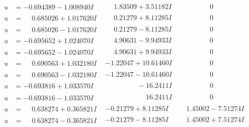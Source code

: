 \documentclass[1p]{elsarticle_modified}
\theoremstyle{definition}
\begin{document}
$$\begin{array}{c|c|c}
\begin{aligned}
u &= -0.694389 - 1.008940 I\end{aligned}
 & \phantom{-}1.83509 + 3.51182 I & \phantom{-0.000000 } 0 \\ \hline\begin{aligned}
u &= \phantom{-}0.685026 + 1.017620 I\end{aligned}
 & \phantom{-}0.21279 + 8.11285 I & \phantom{-0.000000 } 0 \\ \hline\begin{aligned}
u &= \phantom{-}0.685026 - 1.017620 I\end{aligned}
 & \phantom{-}0.21279 - 8.11285 I & \phantom{-0.000000 } 0 \\ \hline\begin{aligned}
u &= -0.695652 + 1.024070 I\end{aligned}
 & \phantom{-}4.90631 - 9.94933 I & \phantom{-0.000000 } 0 \\ \hline\begin{aligned}
u &= -0.695652 - 1.024070 I\end{aligned}
 & \phantom{-}4.90631 + 9.94933 I & \phantom{-0.000000 } 0 \\ \hline\begin{aligned}
u &= \phantom{-}0.690563 + 1.032180 I\end{aligned}
 & -1.22047 + 10.61460 I & \phantom{-0.000000 } 0 \\ \hline\begin{aligned}
u &= \phantom{-}0.690563 - 1.032180 I\end{aligned}
 & -1.22047 - 10.61460 I & \phantom{-0.000000 } 0 \\ \hline\begin{aligned}
u &= -0.693816 + 1.033570 I\end{aligned}
 & \phantom{-0.000000 } -16.2411 I & \phantom{-0.000000 } 0 \\ \hline\begin{aligned}
u &= -0.693816 - 1.033570 I\end{aligned}
 & \phantom{-0.000000 -}16.2411 I & \phantom{-0.000000 } 0 \\ \hline\begin{aligned}
u &= \phantom{-}0.638274 + 0.365821 I\end{aligned}
 & -0.21279 + 8.11285 I & \phantom{-}1.45002 - 7.51274 I \\ \hline\begin{aligned}
u &= \phantom{-}0.638274 - 0.365821 I\end{aligned}
 & -0.21279 - 8.11285 I & \phantom{-}1.45002 + 7.51274 I \\ \hline\begin{aligned}

\end{aligned}
\end{array}$$
\end{document}
